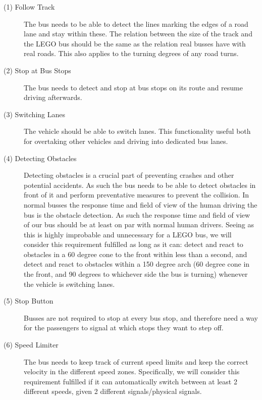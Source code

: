
\begin{description}
    \item [(1) Follow Track]
    The bus needs to be able to detect the lines marking the edges of a road lane and stay within these. The relation between the size of the track and the LEGO bus should be the same as the relation real busses have with real roads. This also applies to the turning degrees of any road turns. 
    
    \item[(2) Stop at Bus Stops]
    The bus needs to detect and stop at bus stops on its route and resume driving afterwards. 

    \item[(3) Switching Lanes] 
    The vehicle should be able to switch lanes. This functionality useful both for overtaking other vehicles and driving into dedicated bus lanes. 
    
    \item[(4) Detecting Obstacles]
    Detecting obstacles is a crucial part of preventing crashes and other potential accidents. As such the bus needs to be able to detect obstacles in front of it and perform preventative measures to prevent the collision. In normal busses the response time and field of view of the human driving the bus is the obstacle detection.  As such the response time and field of view of our bus should be at least on par with normal human drivers. Seeing as this is highly improbable and unnecessary for a LEGO bus, we will consider this requirement fulfilled as long as it can: detect and react to obstacles in a 60 degree cone to the front within less than a second, and detect and react to obstacles within a 150 degree arch (60 degree cone in the front, and 90 degrees to whichever side the bus is turning) whenever the vehicle is switching lanes. 
    
    \item[(5) Stop Button]
    Busses are not required to stop at every bus stop, and therefore need a way for the passengers to signal at which stops they want to step off. 
    
    \item[(6) Speed Limiter]
    The bus needs to keep track of current speed limits and keep the correct velocity in the different speed zones. Specifically, we will consider this requirement fulfilled if it can automatically switch between at least 2 different speeds, given 2 different signals/physical signals.
    

\end{description}
